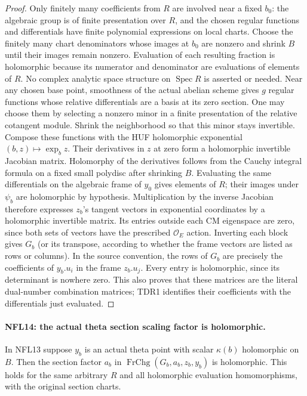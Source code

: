 \documentclass[11pt,a4paper]{article}
\numberwithin{equation}{section}
\theoremstyle{remark}\newtheorem{remark}[theorem]{Remark}
\begin{document}
\begin{proof}
Only finitely many coefficients from $R$ are involved near a
fixed $b_0$: the algebraic group is of finite presentation over
$R$, and the chosen regular functions and differentials have
finite polynomial expressions on local charts.  Choose the
finitely many chart denominators whose images at $b_0$ are
nonzero and shrink $B$ until their images remain nonzero.
Evaluation of each resulting fraction is holomorphic because
its numerator and denominator are evaluations of elements of
$R$.  No complex analytic space structure on
$\operatorname{Spec}R$ is asserted or needed.
Near any chosen base point, smoothness of the actual abelian
scheme gives $g$ regular functions whose relative differentials
are a basis at its zero section.  One may choose them by
selecting a nonzero minor in a finite presentation of the
relative cotangent module.  Shrink the neighborhood so that
this minor stays invertible.
Compose these functions with the HUF holomorphic exponential
$(b,z)\mapsto\exp_bz$.  Their derivatives in $z$ at zero form
a holomorphic invertible Jacobian matrix.  Holomorphy of the
derivatives follows from the Cauchy integral formula on a
fixed small polydisc after shrinking $B$.
Evaluating the same differentials on the algebraic frame of
$y_0$ gives elements of $R$; their images under $\psi_b$ are
holomorphic by hypothesis.  Multiplication by the inverse
Jacobian therefore expresses $z_b$'s tangent vectors in
exponential coordinates by a holomorphic invertible matrix.
Its entries outside each CM eigenspace are zero, since both
sets of vectors have the prescribed $\mathcal O_E$ action.
Inverting each block gives $G_b$ (or its transpose, according
to whether the frame vectors are listed as rows or columns).
In the source convention, the rows of $G_b$ are precisely the
coefficients of $y_b.u_i$ in the frame $z_b.u_j$.
Every entry is holomorphic, since its determinant is nowhere
zero.  This also proves that these matrices are the literal
dual-number combination matrices; TDR1 identifies their
coefficients with the differentials just evaluated.
\end{proof}

\paragraph{NFL14: the actual theta section scaling factor is holomorphic.}
\label{claim:NFL14}
In NFL13 suppose $y_b$ is an actual theta point with scalar
$\kappa(b)$ holomorphic on $B$.  Then the section factor $a_b$
in $\operatorname{FrChg}(G_b,a_b,z_b,y_b)$ is holomorphic.
This holds for the same arbitrary $R$ and all holomorphic
evaluation homomorphisms, with the original section charts.
\end{document}

